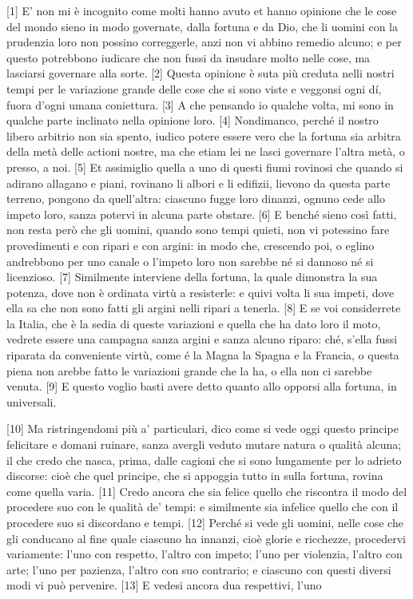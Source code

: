 {[}1{]} E' non mi è incognito come molti hanno avuto et hanno opinione
che le cose del mondo sieno in modo governate, dalla fortuna e da Dio,
che li uomini con la prudenzia loro non possino correggerle, anzi non vi
abbino remedio alcuno; e per questo potrebbono iudicare che non fussi da
insudare molto nelle cose, ma lasciarsi governare alla sorte. {[}2{]}
Questa opinione è suta più creduta nelli nostri tempi per le variazione
grande delle cose che si sono viste e veggonsi ogni dí, fuora d'ogni
umana coniettura. {[}3{]} A che pensando io qualche volta, mi sono in
qualche parte inclinato nella opinione loro. {[}4{]} Nondimanco, perché
il nostro libero arbitrio non sia spento, iudico potere essere vero che
la fortuna sia arbitra della metà delle actioni nostre, ma che etiam lei
ne lasci governare l'altra metà, o presso, a noi. {[}5{]} Et assimiglio
quella a uno di questi fiumi rovinosi che quando si adirano allagano e
piani, rovinano li albori e li edifizii, lievono da questa parte
terreno, pongono da quell'altra: ciascuno fugge loro dinanzi, ognuno
cede allo impeto loro, sanza potervi in alcuna parte obstare. {[}6{]} E
benché sieno così fatti, non resta però che gli uomini, quando sono
tempi quieti, non vi potessino fare provedimenti e con ripari e con
argini: in modo che, crescendo poi, o eglino andrebbono per uno canale o
l'impeto loro non sarebbe né si dannoso né si licenzioso. {[}7{]}
Similmente interviene della fortuna, la quale dimonstra la sua potenza,
dove non è ordinata virtù a resisterle: e quivi volta li sua impeti,
dove ella sa che non sono fatti gli argini nelli ripari a tenerla.
{[}8{]} E se voi considerrete la Italia, che è la sedia di queste
variazioni e quella che ha dato loro il moto, vedrete essere una
campagna sanza argini e sanza alcuno riparo: ché, s'ella fussi riparata
da conveniente virtù, come é la Magna la Spagna e la Francia, o questa
piena non arebbe fatto le variazioni grande che la ha, o ella non ci
sarebbe venuta. {[}9{]} E questo voglio basti avere detto quanto allo
opporsi alla fortuna, in universali.

{[}10{]} Ma ristringendomi più a' particulari, dico come si vede oggi
questo principe felicitare e domani ruinare, sanza avergli veduto mutare
natura o qualità alcuna; il che credo che nasca, prima, dalle cagioni
che si sono lungamente per lo adrieto discorse: cioè che quel principe,
che si appoggia tutto in sulla fortuna, rovina come quella varia.
{[}11{]} Credo ancora che sia felice quello che riscontra il modo del procedere suo con le qualità de' tempi: e similmente sia infelice quello che con il procedere suo si discordano e tempi. {[}12{]} Perché si vede gli uomini, nelle cose che gli conducano al fine quale ciascuno ha innanzi, cioè glorie e ricchezze, procedervi variamente: l'uno con respetto, l'altro con impeto; l'uno per violenzia, l'altro con arte; l'uno per pazienza, l'altro con suo contrario; e ciascuno con questi diversi modi vi può pervenire.
{[}13{]} E vedesi ancora dua respettivi, l'uno \linebreak


